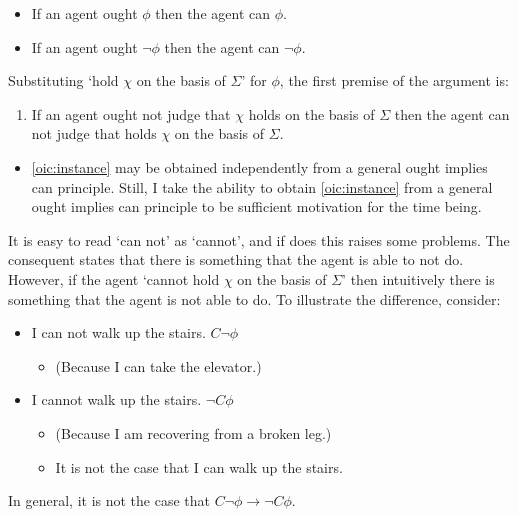 \documentclass[10pt]{article}
\begin{document}
\begin{itemize}
\item If an agent ought \(\phi\) then the agent can \(\phi\).
\item If an agent ought \(\lnot\phi\) then the agent can \(\lnot\phi\).
\end{itemize}

Substituting `hold \(\chi\) on the basis of \(\Sigma\)' for \(\phi\), the first premise of the argument is:

\begin{enumerate}[label=P\arabic*., ref=P\arabic*]
\item\label{oic:instance} If an agent ought not judge that \(\chi\) holds on the basis of \(\Sigma\) then the agent can not judge that holds \(\chi\) on the basis of \(\Sigma\).
\end{enumerate}

\begin{itemize}
\item \ref{oic:instance} may be obtained independently from a general ought implies can principle.
  Still, I take the ability to obtain \ref{oic:instance} from a general ought implies can principle to be sufficient motivation for the time being.
\end{itemize}

\begin{note}
  It is easy to read `can not' as `cannot', and if does this raises some problems. The consequent states that there is something that the agent is able to not do. However, if the agent `cannot hold \(\chi\) on the basis of \(\Sigma\)' then intuitively there is something that the agent is not able to do. To illustrate the difference, consider:
  \begin{itemize}
  \item I can not walk up the stairs. \hfill \(C \lnot \phi\)
    \begin{itemize}
    \item (Because I can take the elevator.)
    \end{itemize}
  \item I cannot walk up the stairs. \hfill  \(\lnot C \phi\)
    \begin{itemize}
    \item (Because I am recovering from a broken leg.)
    \item It is not the case that I can walk up the stairs.
    \end{itemize}
  \end{itemize}
  In general, it is not the case that \(C \lnot\phi \rightarrow \lnot C\phi\).
\end{note}
\end{document}
